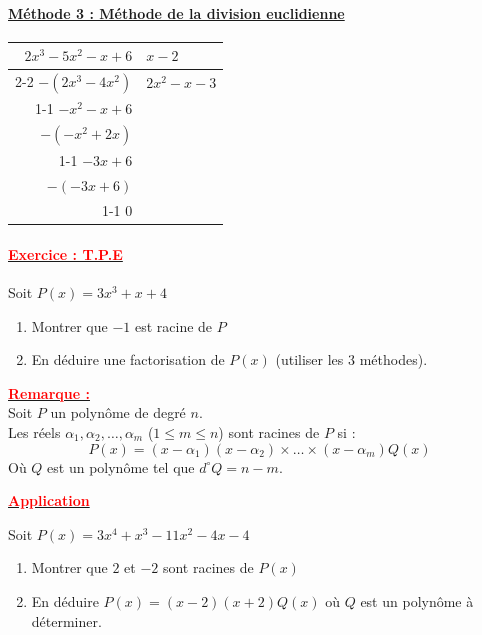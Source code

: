 \documentclass[12pt,a4paper]{article}
\begin{document}
\paragraph{\underline{Méthode 3 : Méthode de la division euclidienne}}
\begin{center}
\renewcommand{\arraystretch}{1.2}
\begin{tabular}{r|l}
$2x^3 - 5x^2 - x + 6$ & $x - 2$ \\ \cline{2-2}
$- (2x^3 - 4x^2)$ & $2x^2 - x - 3$ \\ \cline{1-1}
$-x^2 - x + 6$ & \\
$- (-x^2 + 2x)$ & \\ \cline{1-1}
$-3x + 6$ & \\
$- (-3x + 6)$ & \\ \cline{1-1}
$0$ & 
\end{tabular}
\end{center}

\paragraph{\underline{\textcolor{red}{Exercice : T.P.E}}}

Soit $P(x) = 3x^3 + x + 4$

\begin{enumerate}
    \item Montrer que $-1$ est racine de $P$
    \item En déduire une factorisation de $P(x)$ (utiliser les 3 méthodes).
\end{enumerate}

\vspace{1cm}

\noindent \textbf{\underline{\textcolor{red}{Remarque :}}} \\

Soit $P$ un polynôme de degré $n$. \\
Les réels $\alpha_1, \alpha_2, \dots, \alpha_m$ ($1 \le m \le n$) sont racines de $P$ si :
\[ P(x) = (x - \alpha_1)(x - \alpha_2) \times \dots \times (x - \alpha_m) Q(x) \]
Où $Q$ est un polynôme tel que $d^\circ Q = n - m$.

\begin{center}
    \textbf{\underline{\textcolor{red}{Application}}}
\end{center}
Soit $P(x) = 3x^4 + x^3 - 11x^2 - 4x - 4$

\begin{enumerate}
    \item Montrer que $2$ et $-2$ sont racines de $P(x)$
    \item En déduire $P(x) = (x - 2)(x + 2) Q(x)$ où $Q$ est un polynôme à déterminer.
\end{enumerate}
\end{document}
